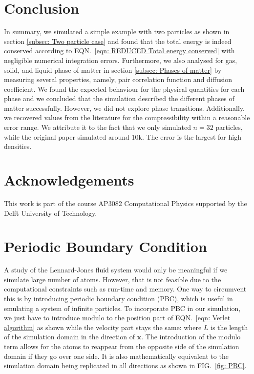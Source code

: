 \documentclass[pra,aps,superscriptaddress,amssymb,amsmath,reprint,noeprint,floatfix]{revtex4-2}
\begin{document}
\section{\label{sec: Conclusion}Conclusion}
In summary, we simulated a simple example with two particles as shown in section \ref{subsec: Two particle case} and found that the total energy is indeed conserved according to EQN.\ \ref{eqn: REDUCED Total energy conserved} with negligible numerical integration errors. Furthermore, we also analysed for gas, solid, and liquid phase of matter in section \ref{subsec: Phases of matter} by measuring several properties, namely, pair correlation function and diffusion coefficient. We found the expected behaviour for the physical quantities for each phase and we concluded that the simulation described the different phases of matter successfully. However, we did not explore phase transitions. Additionally, we recovered values from the literature for the compressibility within a reasonable error range. We attribute it to the fact that we only simulated $n=32$ particles, while the original paper simulated around 10k. The error is the largest for high densities.

\section{\label{sec: Acknowledgements}Acknowledgements}
This work is part of the course AP3082 Computational Physics supported by the Delft University of Technology.

\appendix\label{appendix}
\section{\label{subsec: Periodic Boundary Condition}Periodic Boundary Condition}
A study of the Lennard-Jones fluid system would only be meaningful if we simulate large number of atoms. However, that is not feasible due to the computational constraints such as run-time and memory. One way to circumvent this is by introducing periodic boundary condition (PBC), which is useful in emulating a system of infinite particles. To incorporate PBC in our simulation, we just have to introduce modulo to the position part of EQN.\ \ref{eqn: Verlet algorithm} as shown while the velocity part stays the same:
\Verletalgomod
where $L$ is the length of the simulation domain in the direction of $\mathbf{x}$. The introduction of the modulo term allows for the atoms to reappear from the opposite side of the simulation domain if they go over one side. It is also mathematically equivalent to the simulation domain being replicated in all directions as shown in FIG.\ \ref{fig: PBC}.
\figPBC
\end{document}
